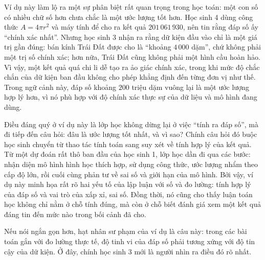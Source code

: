 \documentclass[
  10pt,
  a4paper,
  landscape,
  twoside,
  openany
]{scrbook}
\begin{document}
{
Ví dụ này làm lộ ra một sự phân biệt rất quan trọng trong học toán: một con số có nhiều chữ số hơn chưa chắc là một ước lượng tốt hơn. Học sinh 4 dùng công thức $A = 4\pi r^2$ và máy tính để cho ra kết quả $201\,061\,930$, nên tin rằng đáp số ấy ``chính xác nhất''. Nhưng học sinh 3 nhận ra rằng dữ kiện đầu vào chỉ là một giá trị gần đúng: bán kính Trái Đất được cho là ``khoảng $4\,000$ dặm'', chứ không phải một trị số chính xác; hơn nữa, Trái Đất cũng không phải một hình cầu hoàn hảo. Vì vậy, một kết quả quá chi li dễ tạo ra ảo giác chính xác, trong khi mức độ chắc chắn của dữ kiện ban đầu không cho phép khẳng định đến từng đơn vị như thế. Trong ngữ cảnh này, đáp số khoảng $200$ triệu dặm vuông lại là một ước lượng hợp lý hơn, vì nó phù hợp với độ chính xác thực sự của dữ liệu và mô hình đang dùng.

Điều đáng quý ở ví dụ này là lớp học không dừng lại ở việc ``tính ra đáp số'', mà đi tiếp đến câu hỏi: đâu là ước lượng tốt nhất, và vì sao? Chính câu hỏi đó buộc học sinh chuyển từ thao tác tính toán sang suy xét về tính hợp lý của kết quả. Từ một dự đoán rất thô ban đầu của học sinh 1, lớp học dần đi qua các bước: nhận diện mô hình hình học thích hợp, sử dụng công thức, ước lượng nhẩm theo cấp độ lớn, rồi cuối cùng phản tư về sai số và giới hạn của mô hình. Bởi vậy, ví dụ này minh họa rất rõ hai yếu tố của lập luận với số và đo lường: tính hợp lý của đáp số và vai trò của xấp xỉ, sai số. Đồng thời, nó cũng cho thấy luận toán học không chỉ nằm ở chỗ tính đúng, mà còn ở chỗ biết đánh giá xem một kết quả đáng tin đến mức nào trong bối cảnh đã cho.

Nếu nói ngắn gọn hơn, hạt nhân sư phạm của ví dụ là câu này: trong các bài toán gắn với đo lường thực tế, độ tinh vi của đáp số phải tương xứng với độ tin cậy của dữ kiện. Ở đây, chính học sinh 3 mới là người nhìn ra điều đó rõ nhất.
}
\end{document}
